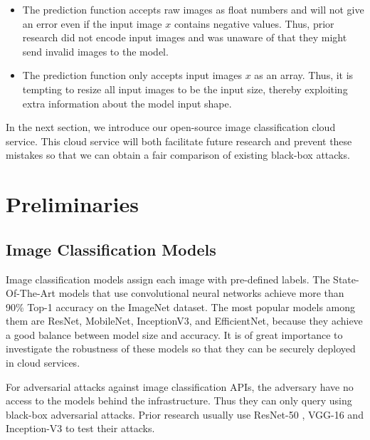 \begin{itemize}
    \item The prediction function accepts raw images as float numbers and will not give an error even if the input image $x$ contains negative values. Thus, prior research did not encode input images and was unaware of that they might send invalid images to the model.
    \item The prediction function only accepts input images $x$ as an array. Thus, it is tempting to resize all input images to be the input size, thereby exploiting extra information about the model input shape.
\end{itemize}


In the next section, we introduce our open-source image classification cloud service. This cloud service will both facilitate future research and prevent these mistakes so that we can obtain a fair comparison of existing black-box attacks.

\section{Preliminaries}

\subsection{Image Classification Models}

Image classification models assign each image with pre-defined labels. The State-Of-The-Art models that use convolutional neural networks achieve more than 90\% Top-1 accuracy on the ImageNet dataset. The most popular models among them are ResNet, MobileNet, InceptionV3, and EfficientNet, because they achieve a good balance between model size and accuracy. It is of great importance to investigate the robustness of these models so that they can be securely deployed in cloud services. 

For adversarial attacks against image classification APIs, the adversary have no access to the models behind the infrastructure. Thus they can only query using black-box adversarial attacks. Prior research usually use ResNet-50 \cite{he2016deep}, VGG-16 \cite{simonyan2014very} and Inception-V3 \cite{szegedy2016rethinking} to test their attacks.

